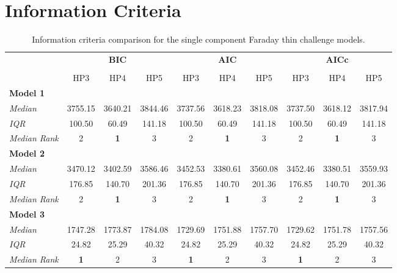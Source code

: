 \section{Information Criteria}
\label{app:ic}

\begin{table*}
\caption{Information criteria comparison for the \protect\cite{Sun_2015} single component Faraday thin challenge models.}
    \centering
    \begin{tabular}{@{\extracolsep{3pt}}lccccccccc@{}}
    \hline
     & \multicolumn{3}{c}{\textbf{BIC}} & \multicolumn{3}{c}{\textbf{AIC}} & \multicolumn{3}{c}{\textbf{AICc}} \\
     \cline{2-4} \cline{5-7} \cline{8-10} \\
     & HP3 & HP4 & HP5 & HP3 & HP4 & HP5 & HP3 & HP4 & HP5 \\\hline
    \textbf{Model 1} & & & & & & & & & \\
    \emph{Median} & 3755.15 & 3640.21 & 3844.46 & 3737.56 & 3618.23 & 3818.08 & 3737.50 & 3618.12 & 3817.94 \\
    \emph{IQR} & 100.50 & 60.49 & 141.18 & 100.50 & 60.49 & 141.18 & 100.50 & 60.49 & 141.18 \\
    \emph{Median Rank} & 2 & \textbf{1} & 3 & 2 & \textbf{1} & 3 & 2 & \textbf{1} & 3 \\\hline
    \textbf{Model 2} & & & & & & & & & \\
    \emph{Median} & 3470.12 & 3402.59 & 3586.46 & 3452.53 & 3380.61 & 3560.08 & 3452.46 & 3380.51 & 3559.93 \\
    \emph{IQR} & 176.85 & 140.70 & 201.36 & 176.85 & 140.70 & 201.36 & 176.85 & 140.70 & 201.36 \\
    \emph{Median Rank} & 2 & \textbf{1} & 3 & 2 & \textbf{1} & 3 & 2 & \textbf{1} & 3 \\\hline
    \textbf{Model 3} & & & & & & & & & \\
    \emph{Median} & 1747.28 & 1773.87 & 1784.08 &1729.69 & 1751.88 & 1757.70 & 1729.62 & 1751.78 & 1757.56 \\
    \emph{IQR} & 24.82 & 25.29 & 40.32 & 24.82 & 25.29 & 40.32 & 24.82 & 25.29 & 40.32 \\
    \emph{Median Rank} & \textbf{1} & 2 & 3 & \textbf{1} & 2 & 3 & \textbf{1} & 2 & 3 \\\hline
    \end{tabular}
 \label{tab:icthin}
\end{table*}

